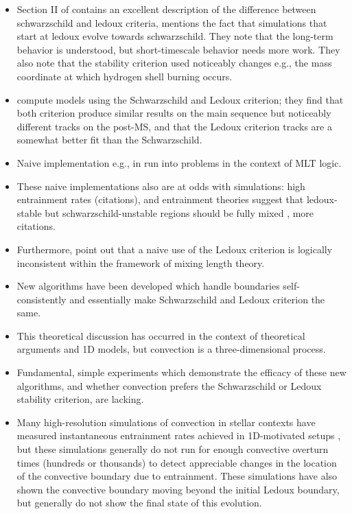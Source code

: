 \begin{itemize}
    \item Section II of \citet{kaiser_etal_2020} contains an excellent description of the difference between schwarzschild and ledoux criteria, mentions the fact that simulations that start at ledoux evolve towards schwarzschild.
        They note that the long-term behavior is understood, but short-timescale behavior needs more work.
        They also note that the stability criterion used noticeably changes e.g., the mass coordinate at which hydrogen shell burning occurs.
    \item \citet{georgy_etal_2021} compute models using the Schwarzschild and Ledoux criterion; they find that both criterion produce similar results on the main sequence but noticeably different tracks on the post-MS, and that the Ledoux criterion tracks are a somewhat better fit than the Schwarzschild.    
    \item Naive implementation e.g., in \citet{mesa2} run into problems in the context of MLT logic.
    \item These naive implementations also are at odds with simulations: high entrainment rates (citations), and entrainment theories suggest that ledoux-stable but schwarzschild-unstable regions should be fully mixed \citep{fuentes_cumming_2020}, more citations.
    \item Furthermore, \citet{gabriel_etal_2014} point out that a naive use of the Ledoux criterion is logically inconsistent within the framework of mixing length theory.
    \item New algorithms \citep{mesa4, mesa5} have been developed which handle boundaries self-consistently and essentially make Schwarzschild and Ledoux criterion the same.
    \item This theoretical discussion has occurred in the context of theoretical arguments and 1D models, but convection is a three-dimensional process.
    \item Fundamental, simple experiments which demonstrate the efficacy of these new algorithms, and whether convection prefers the Schwarzschild or Ledoux stability criterion, are lacking.
    \item Many high-resolution simulations of convection in stellar contexts have measured instantaneous entrainment rates achieved in 1D-motivated setups \citep{meakin_arnett_2007, woodward_etal_2015, jones_etal_2017, cristini_etal_2019, andrassy_etal_2020}, but these simulations generally do not run for enough convective overturn times (hundreds or thousands) to detect appreciable changes in the location of the convective boundary due to entrainment.
        These simulations have also shown the convective boundary moving beyond the initial Ledoux boundary, but generally do not show the final state of this evolution.
\end{itemize}


